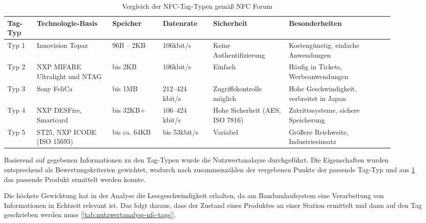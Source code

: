 \begin{table}[H]
	\centering
	\caption{Vergleich der NFC-Tag-Typen gemäß NFC Forum \cite{nfcforum2024}}
	\label{tab:nfc_typen}
	\begin{tabular}{|p{0.075\linewidth}|p{0.18\linewidth}|p{0.12\linewidth}|p{0.12\linewidth}|p{0.18\linewidth}|p{0.25\linewidth}|}
		\hline
		\textbf{Tag-Typ} & \textbf{Technologie-Basis} & \textbf{Speicher} & \textbf{Datenrate} & \textbf{Sicherheit} & \textbf{Besonderheiten} \\
		\hline
		Typ 1 & Innovision Topaz & 96B – 2KB & 106kbit/s & Keine Authentifizierung & Kostengünstig, einfache Anwendungen \\
		Typ 2 & NXP MIFARE Ultralight und NTAG & bis 2KB & 106kbit/s & Einfach & Häufig in Tickets, Werbeanwendungen \\
		Typ 3 & Sony FeliCa & bis 1MB & 212–424 kbit/s & Zugriffskontrolle möglich & Hohe Geschwindigkeit, verbreitet in Japan \\
		Typ 4 & NXP DESFire, Smartcard & bis 32KB+ & 106–424 kbit/s & Hohe Sicherheit (AES, ISO 7816) & Zutrittssysteme, sichere Speicherung \\
		Typ 5 & ST25, NXP ICODE (ISO 15693) & bis ca. 64KB & bis 53kbit/s & Variabel & Größere Reichweite, Industrieeinsatz \\
		\hline
	\end{tabular}
\end{table}

Basierend auf gegebenen Informationen zu den Tag-Typen wurde die Nutzwertanalayse durchgeführt. Die Eigenschaften wurden entsprechend als Bewertungskriterien gewichtet, wodurch nach zusammenzählen der vergebenen Punkte der passende Tag-Typ und aus \ref{tab:nfc_typen} das passende Produkt ermittelt werden konnte. 

Die höchste Gewichtung hat in der Analyse die Lesegeschwindigkeit erhalten, da am Bandumlaufsystem eine Verarbeitung von Informationen in Echtzeit relevant ist. Das folgt daraus, dass der Zustand eines Produktes an einer Station ermittelt und dann auf den Tag geschrieben werden muss [\ref{tab:nutzwertanalyse-nfc-tags}].

